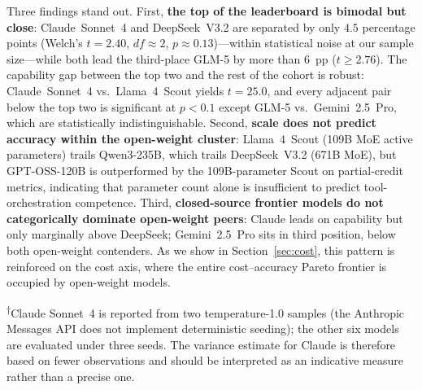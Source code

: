\documentclass[10pt,twocolumn]{article}
\begin{document}
Three findings stand out. First, \textbf{the top of the leaderboard is bimodal but close}: Claude~Sonnet~4 and DeepSeek~V3.2 are separated by only $4.5$ percentage points (Welch's $t=2.40$, $df\!\approx\!2$, $p\!\approx\!0.13$)---within statistical noise at our sample size---while both lead the third-place GLM-5 by more than $6$~pp ($t\!\geq\!2.76$). The capability gap between the top two and the rest of the cohort is robust: Claude~Sonnet~4 vs.\ Llama~4~Scout yields $t=25.0$, and every adjacent pair below the top two is significant at $p<0.1$ except GLM-5 vs.\ Gemini~2.5~Pro, which are statistically indistinguishable. Second, \textbf{scale does not predict accuracy within the open-weight cluster}: Llama~4~Scout (109B MoE active parameters) trails Qwen3-235B, which trails DeepSeek~V3.2 (671B MoE), but GPT-OSS-120B is outperformed by the 109B-parameter Scout on partial-credit metrics, indicating that parameter count alone is insufficient to predict tool-orchestration competence. Third, \textbf{closed-source frontier models do not categorically dominate open-weight peers}: Claude leads on capability but only marginally above DeepSeek; Gemini~2.5~Pro sits in third position, below both open-weight contenders. As we show in Section~\ref{sec:cost}, this pattern is reinforced on the cost axis, where the entire cost--accuracy Pareto frontier is occupied by open-weight models.

\begin{table}[t]
\caption{Capability leaderboard: seven models on 93 GeoNatureAgent Benchmark v5 tasks. Accuracy is the per-seed mean with one standard deviation, decoupled from cost (Section~\ref{sec:scoring}). Cost is the mean total cost of one seed run (93 cases); \$/case is the per-call mean.}
\label{tab:leaderboard}
\centering
\small
{}
\vspace{2pt}
\raggedright\footnotesize
\textsuperscript{$\dagger$}Claude Sonnet~4 is reported from two temperature-1.0 samples (the Anthropic Messages API does not implement deterministic seeding); the other six models are evaluated under three seeds. The variance estimate for Claude is therefore based on fewer observations and should be interpreted as an indicative measure rather than a precise one.
\end{table}
\end{document}
